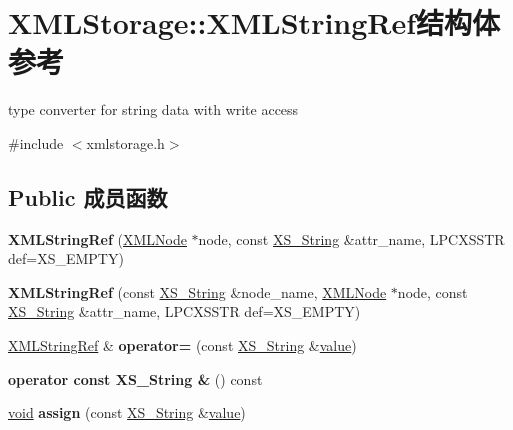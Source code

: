 \hypertarget{struct_x_m_l_storage_1_1_x_m_l_string_ref}{}\section{X\+M\+L\+Storage\+:\+:X\+M\+L\+String\+Ref结构体 参考}
\label{struct_x_m_l_storage_1_1_x_m_l_string_ref}


type converter for string data with write access  




{\ttfamily \#include $<$xmlstorage.\+h$>$}

\subsection*{Public 成员函数}
\begin{DoxyCompactItemize}
\item 
\mbox{\label{struct_x_m_l_storage_1_1_x_m_l_string_ref_a2ac81888dc2fcd22131a091f6038bf10}} 
{\bfseries X\+M\+L\+String\+Ref} (\hyperlink{struct_x_m_l_storage_1_1_x_m_l_node}{X\+M\+L\+Node} $\ast$node, const \hyperlink{struct_x_m_l_storage_1_1_x_s___string}{X\+S\+\_\+\+String} \&attr\+\_\+name, L\+P\+C\+X\+S\+S\+TR def=X\+S\+\_\+\+E\+M\+P\+TY)
\item 
\mbox{\label{struct_x_m_l_storage_1_1_x_m_l_string_ref_a070de0ec941234d0b81fd78a28ea5866}} 
{\bfseries X\+M\+L\+String\+Ref} (const \hyperlink{struct_x_m_l_storage_1_1_x_s___string}{X\+S\+\_\+\+String} \&node\+\_\+name, \hyperlink{struct_x_m_l_storage_1_1_x_m_l_node}{X\+M\+L\+Node} $\ast$node, const \hyperlink{struct_x_m_l_storage_1_1_x_s___string}{X\+S\+\_\+\+String} \&attr\+\_\+name, L\+P\+C\+X\+S\+S\+TR def=X\+S\+\_\+\+E\+M\+P\+TY)
\item 
\mbox{\label{struct_x_m_l_storage_1_1_x_m_l_string_ref_aa8594bd2648184e22ca11756ae3c3538}} 
\hyperlink{struct_x_m_l_storage_1_1_x_m_l_string_ref}{X\+M\+L\+String\+Ref} \& {\bfseries operator=} (const \hyperlink{struct_x_m_l_storage_1_1_x_s___string}{X\+S\+\_\+\+String} \&\hyperlink{unionvalue}{value})
\item 
\mbox{\label{struct_x_m_l_storage_1_1_x_m_l_string_ref_ae84f294e6de34ecef53f42a20e322ea3}} 
{\bfseries operator const X\+S\+\_\+\+String \&} () const
\item 
\mbox{\label{struct_x_m_l_storage_1_1_x_m_l_string_ref_aedced3dbf4dc648c31612182580b2e0e}} 
\hyperlink{interfacevoid}{void} {\bfseries assign} (const \hyperlink{struct_x_m_l_storage_1_1_x_s___string}{X\+S\+\_\+\+String} \&\hyperlink{unionvalue}{value})
\end{DoxyCompactItemize}
